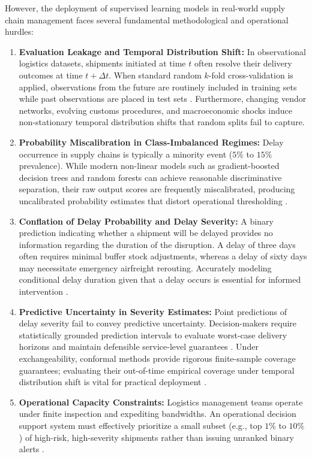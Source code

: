 \documentclass[11pt,a4paper]{article}
\begin{document}
However, the deployment of supervised learning models in real-world supply chain management faces several fundamental methodological and operational hurdles:
\begin{enumerate}
    \item \textbf{Evaluation Leakage and Temporal Distribution Shift:} In observational logistics datasets, shipments initiated at time $t$ often resolve their delivery outcomes at time $t + \Delta t$. When standard random $k$-fold cross-validation is applied, observations from the future are routinely included in training sets while past observations are placed in test sets \cite{kapoor2023leakage, roberts2017crossvalidation}. Furthermore, changing vendor networks, evolving customs procedures, and macroeconomic shocks induce non-stationary temporal distribution shifts that random splits fail to capture.
    \item \textbf{Probability Miscalibration in Class-Imbalanced Regimes:} Delay occurrence in supply chains is typically a minority event ($5\%$ to $15\%$ prevalence). While modern non-linear models such as gradient-boosted decision trees and random forests can achieve reasonable discriminative separation, their raw output scores are frequently miscalibrated, producing uncalibrated probability estimates that distort operational thresholding \cite{platt1999probabilistic, niculescu2005predicting, guo2017calibration}.
    \item \textbf{Conflation of Delay Probability and Delay Severity:} A binary prediction indicating whether a shipment will be delayed provides no information regarding the duration of the disruption. A delay of three days often requires minimal buffer stock adjustments, whereas a delay of sixty days may necessitate emergency airfreight rerouting. Accurately modeling conditional delay duration given that a delay occurs is essential for informed intervention \cite{koenker1978regression, kurentzes2020optimising}.
    \item \textbf{Predictive Uncertainty in Severity Estimates:} Point predictions of delay severity fail to convey predictive uncertainty. Decision-makers require statistically grounded prediction intervals to evaluate worst-case delivery horizons and maintain defensible service-level guarantees \cite{romano2019cqr, angelopoulos2023gentle}. Under exchangeability, conformal methods provide rigorous finite-sample coverage guarantees; evaluating their out-of-time empirical coverage under temporal distribution shift is vital for practical deployment \cite{barber2023beyond, gibbs2021adaptive}.
    \item \textbf{Operational Capacity Constraints:} Logistics management teams operate under finite inspection and expediting bandwidths. An operational decision support system must effectively prioritize a small subset (e.g., top $1\%$ to $10\%$) of high-risk, high-severity shipments rather than issuing unranked binary alerts \cite{bastani2021efficient, bertsimas2020predictive}.
\end{enumerate}
\end{document}
